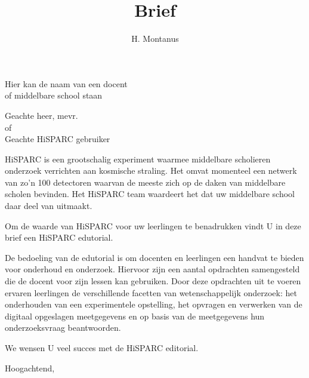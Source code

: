 \documentclass[11pt,a4paper]{letter}
\begin{document}
\title{Brief}
\author{H. Montanus}
\date{}

\maketitle
 
\begin{letter}{Hier kan de naam van een docent \\ of middelbare school staan}
\opening{Geachte heer, mevr.  \\of   \\Geachte HiSPARC gebruiker}

HiSPARC is een grootschalig experiment waarmee middelbare scholieren
onderzoek verrichten aan kosmische straling. Het omvat momenteel een
netwerk van zo'n 100 detectoren waarvan de meeste zich op de daken van
middelbare scholen bevinden. Het HiSPARC team waardeert het dat uw
middelbare school daar deel van uitmaakt.  

Om de waarde van HiSPARC voor uw leerlingen te benadrukken vindt U in
deze brief een HiSPARC edutorial.

De bedoeling van de edutorial is om docenten en leerlingen een handvat
te bieden voor onderhoud en onderzoek. Hiervoor zijn een aantal
opdrachten samengesteld die de docent voor zijn lessen kan gebruiken.
Door deze opdrachten uit te voeren ervaren leerlingen de verschillende
facetten van wetenschappelijk onderzoek: het onderhouden van een
experimentele opstelling, het opvragen en verwerken van de digitaal
opgeslagen meetgegevens en op basis van de meetgegevens hun
onderzoeksvraag beantwoorden. 

We wensen U veel succes met de HiSPARC editorial.
 
\closing{Hoogachtend,}

 
\end{letter}
 
\end{document}
